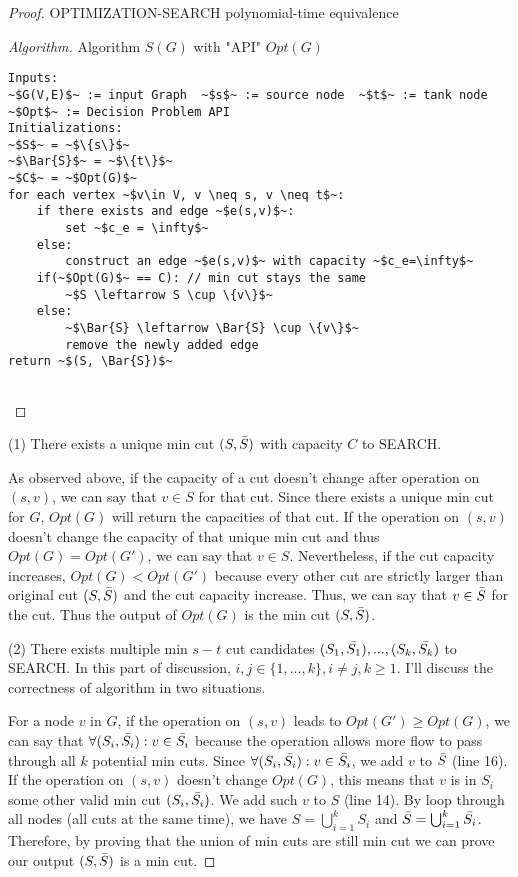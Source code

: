 \documentclass[openany]{article}
\begin{document}
\begin{proof}{}{OPTIMIZATION-SEARCH polynomial-time equivalence}
\begin{proof}[Algorithm]{}
		\renewcommand{\qedsymbol}{}
		Algorithm $S(G)$ with "API" $Opt(G)$
		\begin{lstlisting}[basicstyle=\fontsize{8}{9}\selectfont\ttfamily]
Inputs:
~$G(V,E)$~ := input Graph  ~$s$~ := source node  ~$t$~ := tank node
~$Opt$~ := Decision Problem API
Initializations:
~$S$~ = ~$\{s\}$~
~$\Bar{S}$~ = ~$\{t\}$~
~$C$~ = ~$Opt(G)$~
for each vertex ~$v\in V, v \neq s, v \neq t$~:
    if there exists and edge ~$e(s,v)$~:
        set ~$c_e = \infty$~
    else:
        construct an edge ~$e(s,v)$~ with capacity ~$c_e=\infty$~
    if(~$Opt(G)$~ == C): // min cut stays the same
        ~$S \leftarrow S \cup \{v\}$~
    else:
        ~$\Bar{S} \leftarrow \Bar{S} \cup \{v\}$~
        remove the newly added edge
return ~$(S, \Bar{S})$~
    
		\end{lstlisting} 
\end{proof}




(1) There exists a unique min cut $(S,\Bar{S})$ with capacity $C$ to SEARCH.

As observed above, if the capacity of a cut doesn't change after operation on $(s,v)$, we can say that $v\in S$ for that cut. Since there exists a unique min cut for $G$, $Opt(G)$ will return the capacities of that cut. If the operation on $(s,v)$ doesn't change the capacity of that unique min cut and thus $Opt(G) = Opt(G')$, we can say that $v\in S$. Nevertheless, if the cut capacity increases, $Opt(G) < Opt(G')$ because every other cut are strictly larger than original cut $(S,\Bar{S})$ and the cut capacity increase. Thus, we can say that $v \in \Bar{S}$ for the cut. Thus the output of $Opt(G)$ is the min cut $(S,\Bar{S})$.

(2) There exists multiple min $s-t$ cut candidates $(S_1,\Bar{S_1}), ... , (S_k,\Bar{S_k})$ to SEARCH. In this part of discussion, $i,j \in \{1,...,k\}, i\neq j, k \geqslant 1$. I'll discuss the correctness of algorithm in two situations.

For a node $v$ in $G$, if the operation on $(s,v)$ leads to $Opt(G') \geqslant Opt(G)$, we can say that $\forall (S_i, \Bar{S_i}): v \in \Bar{S_i}$ because the operation allows more flow to pass through all $k$ potential min cuts. Since $\forall (S_i, \Bar{S_i}): v\in \Bar{S_i}$, we add $v$ to $\Bar{S}$ (line 16). If the operation on $(s,v)$ doesn't change $Opt(G)$, this means that $v$ is in $S_i$ some other valid min cut $(S_i,\Bar{S_i})$. We add such $v$ to $S$ (line 14). By loop through all nodes (all cuts at the same time), we have $S = \bigcup_{i=1}^{k}S_i$ and $\Bar{S} = \bigcup_{i=1}^{k}\Bar{S_i}$. Therefore, by proving that the union of min cuts are still min cut we can prove our output $(S,\Bar{S})$ is a min cut.


\end{proof}
\end{document}
